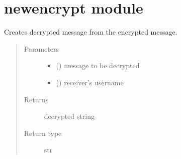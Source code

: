 \documentclass[letterpaper,10pt,english]{sphinxmanual}
\begin{document}
\section{newencrypt module}
\label{\detokenize{newencrypt:module-newencrypt}}\label{\detokenize{newencrypt:newencrypt-module}}\label{\detokenize{newencrypt::doc}}

\begin{fulllineitems}
\label{\detokenize{newencrypt:newencrypt.decrypt}}
Creates decrypted message from the encrypted message.
\begin{quote}\begin{description}
\item[{Parameters}] \leavevmode\begin{itemize}
\item {} 
 () \textendash{} message to be decrypted

\item {} 
 () \textendash{} receiver’s username

\end{itemize}

\item[{Returns}] \leavevmode
decrypted string

\item[{Return type}] \leavevmode
str

\end{description}\end{quote}

\end{fulllineitems}

\end{document}
